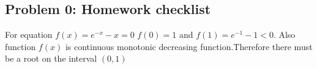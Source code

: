 \documentclass{article}
\begin{document}
 



\hypertarget{problem_0_homework_checklist_2}{}
\subsection*{{Problem 0: Homework checklist}}
\label{problem_0_homework_checklist_2}

For equation $f(x) = e^{-x}-x=0 $  \newline
$f(0)=1$ and $f(1)=e^{-1}-1<0$.  Also function $f(x)$ is continuous monotonic decreasing function.Therefore there must be a root on the interval $(0,1) $ \newline
\end{document}
